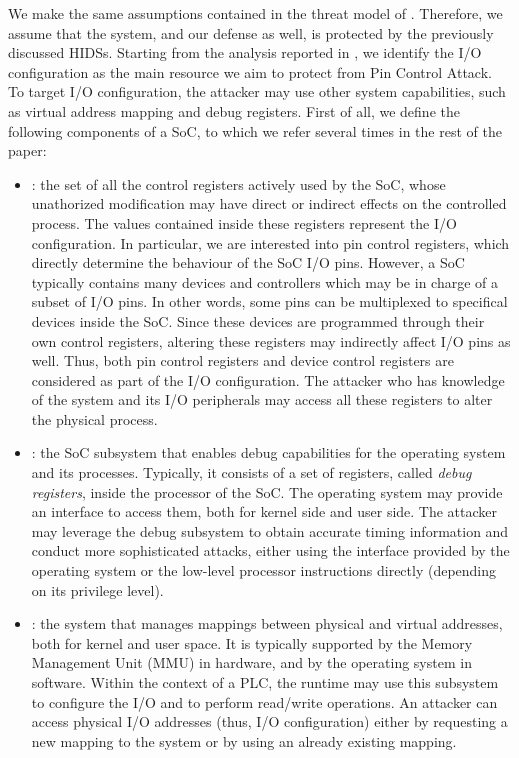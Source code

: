 We make the same assumptions contained in the threat model of .
Therefore, we assume that the system, and our defense as well, is protected by the previously discussed HIDSs.
Starting from the analysis reported in , we identify the I/O configuration as the main resource we aim to protect from Pin Control Attack.
To target I/O configuration, the attacker may use other system capabilities, such as virtual address mapping and debug registers.
First of all, we define the following components of a SoC, to which we refer several times in the rest of the paper:
\begin{itemize}
	\item {}: the set of all the control registers actively used by the SoC, whose unathorized modification may have direct or indirect
		effects on the controlled process. The values contained inside these registers represent the I/O configuration.
		In particular, we are interested into pin control registers, which directly determine the behaviour of the SoC I/O pins.
		However, a SoC typically contains many devices and controllers which may be in charge of a subset of I/O pins. In other words, some pins
		can be multiplexed to specifical devices inside the SoC. Since these devices are programmed through their own control registers,
		altering these registers may indirectly affect I/O pins as well. Thus, both pin control registers and device control registers
		are considered as part of the I/O configuration. The attacker who has knowledge of the system and its I/O peripherals may access
		all these registers to alter the physical process.
	\item {}: the SoC subsystem that enables debug capabilities for the operating system and its processes.
		Typically, it consists of a set of registers, called \emph{debug registers}, inside the processor of the SoC.
		The operating system may provide an interface to access them, both for kernel side and user side.
		The attacker may leverage the debug subsystem to obtain accurate timing information and conduct more sophisticated attacks,
		either using the interface provided by the operating system or the low-level processor instructions directly (depending on its privilege level).
	\item {}: the system that manages mappings between physical and virtual addresses, both for kernel and user space.
		It is typically supported by the Memory Management Unit (MMU) in hardware, and by the operating system in software. Within the context of a PLC,
		the runtime may use this subsystem to configure the I/O and to perform read/write operations. An attacker can access physical I/O addresses
		(thus, I/O configuration) either by requesting a new mapping to the system or by using an already existing mapping.
\end{itemize}

